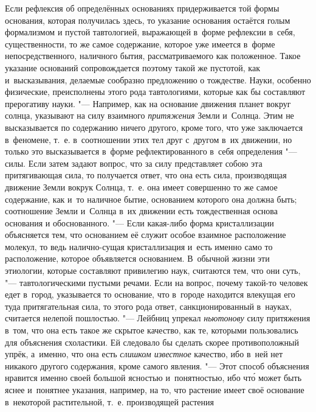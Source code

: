 Если рефлексия об определённых основаниях придерживается той формы основания,
которая получилась здесь, то указание основания остаётся голым формализмом и
пустой тавтологией, выражающей в~форме рефлексии в~себя, существенности, то же
самое содержание, которое уже имеется в~форме непосредственного, наличного
бытия, рассматриваемого как положенное. Такое указание оснований сопровождается
поэтому такой же пустотой, как и~высказывания, делаемые сообразно предложению о
тождестве. Науки, особенно физические, преисполнены этого рода тавтологиями,
которые как бы составляют прерогативу науки. "--- Например, как на основание
движения планет вокруг солнца, указывают на силу взаимного {\em притяжения}
Земли и~Солнца. Этим не высказывается по содержанию ничего другого, кроме того,
что уже заключается в~феномене, т.~е. в~соотношении этих тел друг с~другом в~их
движении, но только это высказывается в~форме рефлектированного в~себя
определения "--- силы. Если затем задают вопрос, что за силу представляет собою
эта притягивающая сила, то получается ответ, что она есть сила, производящая
движение Земли вокрук Солнца, т.~е. она имеет совершенно то же самое
содержание, как и~то наличное бытие, основанием которого она должна быть;
соотношение Земли и~Солнца в~их движении есть тождественная основа основания и
обоснованного. "--- Если какая-либо форма кристаллизации объясняется тем, что
основанием её служит особое взаимное расположение молекул, то ведь
налично-сущая кристаллизация и~есть именно само то расположение, которое
объявляется основанием. В~обычной жизни эти этиологии, которые составляют привилегию наук, считаются тем, что они суть,
"--- тавтологическими пустыми речами. Если на вопрос, почему такой-то человек
едет в~город, указывается то основание, что в~городе находится влекущая его
туда притягательная сила, то этого рода ответ, санкционированный в~науках,
считается нелепой пошлостью. "--- Лейбниц упрекал {\em ньютонову} силу
притяжения в~том, что она есть такое же скрытое качество, как те, которыми
пользовались для объяснения схоластики. Ей следовало бы сделать скорее
противоположный упрёк, а~именно, что она есть {\em слишком известное} качество,
ибо в~ней нет никакого другого содержания, кроме самого явления. "--- Этот
способ объяснения нравится именно своей большой ясностью и~понятностью, ибо
чт\'{о} может быть яснее и~понятнее указания, например, на то, что растение
имеет своё основание в~некоторой растительной, т.~е. производящей растения
